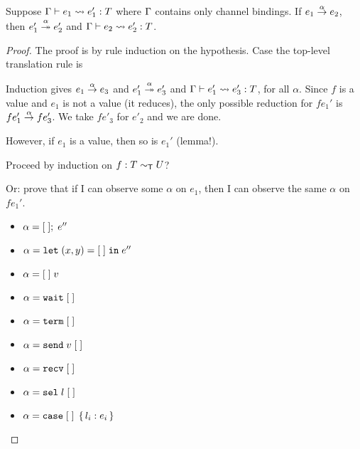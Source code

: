 \begin{lemma}
  Suppose $\Ctxt \vdash e_1 \leadsto e'_1 : T$ where $\Ctxt$ contains
  only channel bindings.  If
  $\reduce[\alpha]{e_1}{e_2}$, then $\reducemany[\alpha]{e'_1}{e'_2}$
  and $\Ctxt \vdash e_2 \leadsto e'_2 : T$.
\end{lemma}
\begin{proof}
  The proof is by rule induction on the hypothesis.
  Case the top-level translation rule is
  \begin{mathpar}
  \end{mathpar}
  Induction gives $\reduce[\alpha]{e_1}{e_3}$ and
  $\reducemany[\alpha]{e_1'}{e'_3}$ and $\Ctxt \vdash e_1' \leadsto e'_3 : T$,
  for all $\alpha$.
  Since $f$ is a value and $e_1$ is not a value (it reduces), the only
  possible reduction for $f e_1'$ is $\reduce[\alpha]{f e_1'}{f e'_3}$.
  We take $f e'_3$ for $e'_2$ and we are done.



  However, if $e_1$ is a value, then so is $e_1'$ (lemma!). 


  Proceed by induction on $f : T \eqt U$?

  Or: prove that if I can observe some $\alpha$ on $e_1$, then I can
  observe the same $\alpha$ on $f e_1'$.

  \begin{itemize}
  \item $\alpha = \ELetU\EHole{e''}$
  \item $\alpha = \ELetP xy\EHole{e''}$
  \item $\alpha = \EHole\; v$
  \item $\alpha = \EWait\EHole$
  \item $\alpha = \ETerm\EHole$
  \item $\alpha = \ESend{v}\EHole$
  \item $\alpha = \ERecv\EHole$
  \item $\alpha = \ESelect l \EHole$
  \item $\alpha = \ECase\EHole{l_i: e_i}$
  \end{itemize}
  
\end{proof}

